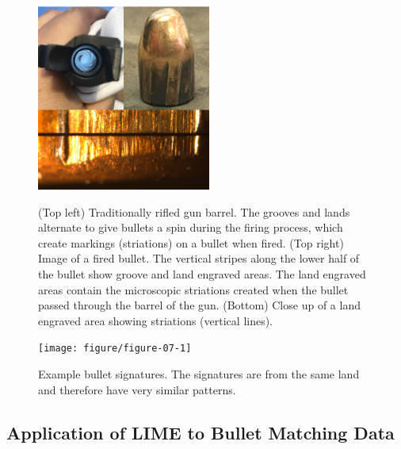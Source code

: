 \documentclass[AMS,STIX2COL]{WileyNJD-v2}\usepackage[]{graphicx}\usepackage[]{color}
\newenvironment{knitrout}{}{} %
\begin{document}
\begin{figure}[!t]
\centering
\begin{knitrout}
\color{fgcolor}

{\centering \includegraphics[width=2.25in]{figure-static/figure-06-1} 

}



\end{knitrout}
\caption{(Top left) Traditionally rifled gun barrel. The grooves and lands alternate to give bullets a spin during the firing process, which create markings (striations) on a bullet when fired. (Top right) Image of a fired bullet. The vertical stripes along the lower half of the bullet show groove and land engraved areas. The land engraved areas contain the microscopic striations created when the bullet passed through the barrel of the gun. (Bottom) Close up of a land engraved area showing striations (vertical lines).}
\label{fig:figure-06}

\vspace*{\floatsep}

\begin{knitrout}
\color{fgcolor}

{\centering \texttt{[image: figure/figure-07-1]} 

}



\end{knitrout}
\caption{Example bullet signatures. The signatures are from the same land and therefore have very similar patterns.}
\label{fig:figure-07}
\end{figure}

\subsection{Application of LIME to Bullet Matching Data}
\end{document}
